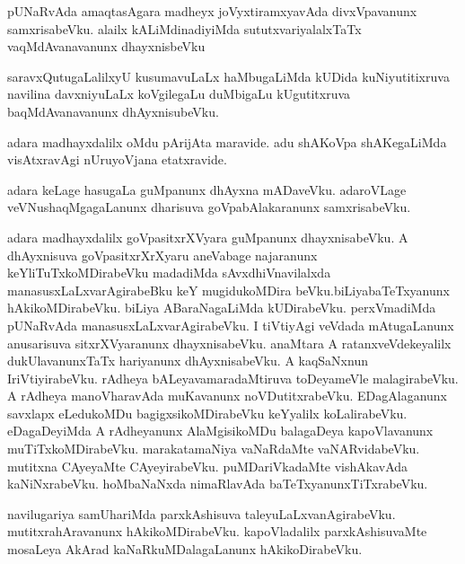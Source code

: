 \documentclass{article}
\begin{document}
\begin{mn}%
pUNaRvAda amaqtasAgara madheyx joVyxtiramxyavAda divxVpavanunx samxrisabeVku. alailx 
kALiMdinadiyiMda sututxvariyalalxTaTx vaqMdAvanavanunx dhayxnisbeVku
\end{mn}

\begin{mn}%
saravxQutugaLalilxyU kusumavuLaLx haMbugaLiMda kUDida kuNiyutitixruva navilina 
davxniyuLaLx koVgilegaLu duMbigaLu kUgutitxruva baqMdAvanavanunx dhAyxnisubeVku.
\end{mn}

\begin{mn}%
adara madhayxdalilx oMdu pArijAta maravide. adu shAKoVpa shAKegaLiMda visAtxravAgi 
nUruyoVjana etatxravide.
\end{mn}

\begin{mn}%
adara keLage hasugaLa guMpanunx dhAyxna mADaveVku. adaroVLage veVNushaqMgagaLanunx 
dharisuva goVpabAlakaranunx samxrisabeVku.
\end{mn}

\begin{mn}%
adara madhayxdalilx goVpasitxrXVyara guMpanunx dhayxnisabeVku. A dhAyxnisuva 
goVpasitxrXrXyaru aneVabage najaranunx keYliTuTxkoMDirabeVku madadiMda sAvxdhiVnavilalxda  
manasusxLaLxvarAgirabeBku keY mugidukoMDira beVku.biLiyabaTeTxyanunx hAkikoMDirabeVku. 
biLiya ABaraNagaLiMda kUDirabeVku. perxVmadiMda pUNaRvAda manasusxLaLxvarAgirabeVku. I 
tiVtiyAgi veVdada mAtugaLanunx anusarisuva sitxrXVyaranunx dhayxnisabeVku. anaMtara A 
ratanxveVdekeyalilx dukUlavanunxTaTx hariyanunx dhAyxnisabeVku. A kaqSaNxnun 
IriVtiyirabeVku. rAdheya bALeyavamaradaMtiruva toDeyameVle malagirabeVku. A rAdheya 
manoVharavAda muKavanunx noVDutitxrabeVku. EDagAlaganunx savxlapx eLedukoMDu 
bagigxsikoMDirabeVku keYyalilx koLalirabeVku. eDagaDeyiMda A rAdheyanunx AlaMgisikoMDu 
balagaDeya kapoVlavanunx muTiTxkoMDirabeVku. marakatamaNiya vaNaRdaMte vaNARvidabeVku. 
mutitxna CAyeyaMte CAyeyirabeVku. puMDariVkadaMte vishAkavAda kaNiNxrabeVku. hoMbaNaNxda 
nimaRlavAda baTeTxyanunxTiTxrabeVku.
\end{mn}

\begin{mn}%
navilugariya samUhariMda parxkAshisuva taleyuLaLxvanAgirabeVku. mutitxrahAravanunx 
hAkikoMDirabeVku. kapoVladalilx parxkAshisuvaMte mosaLeya AkArad kaNaRkuMDalagaLanunx 
hAkikoDirabeVku.
\end{mn}
\end{document}
